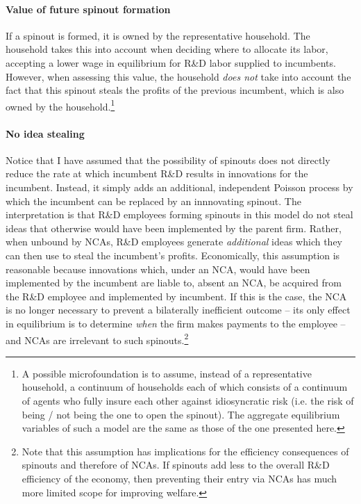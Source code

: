 \documentclass[11pt,english]{article}
\theoremstyle{remark}
\begin{document}
\paragraph{Value of future spinout formation}

If a spinout is formed, it is owned by the representative household. The household takes this into account when deciding where to allocate its labor, accepting a lower wage in equilibrium for R\&D labor supplied to incumbents. However, when assessing this value, the household \textit{does not} take into account the fact that this spinout steals the profits of the previous incumbent, which is also owned by the household.\footnote{A possible microfoundation is to assume, instead of a representative household, a continuum of households each of which consists of a continuum of agents who fully insure each other against idiosyncratic risk (i.e. the risk of being / not being the one to open the spinout). The aggregate equilibrium variables of such a model are the same as those of the one presented here.} 



\paragraph{No idea stealing} Notice that I have assumed that the possibility of spinouts does not directly reduce the rate at which incumbent R\&D results in innovations for the incumbent. Instead, it simply adds an additional, independent Poisson process by which the incumbent can be replaced by an innnovating spinout. The interpretation is that R\&D employees forming spinouts in this model do not steal ideas that otherwise would have been implemented by the parent firm. Rather, when unbound by NCAs, R\&D employees generate \textit{additional} ideas which they can then use to steal the incumbent's profits. Economically, this assumption is reasonable because innovations which, under an NCA, would have been implemented by the incumbent are liable to, absent an NCA, be acquired from the R\&D employee and implemented by incumbent. If this is the case, the NCA is no longer necessary to prevent a bilaterally inefficient outcome -- its only effect in equilibrium is to determine \textit{when} the firm makes payments to the employee -- and NCAs are irrelevant to such spinouts.\footnote{Note that this assumption has implications for the efficiency consequences of spinouts and therefore of NCAs. If spinouts add less to the overall R\&D efficiency of the economy, then preventing their entry via NCAs has much more limited scope for improving welfare.}
\end{document}
